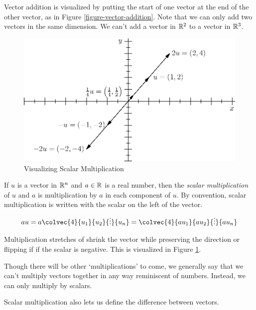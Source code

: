 \documentclass[fleqn,letterpaper]{report}
\begin{document}
Vector addition is visualized by putting the start of one
vector at the end of the other vector, as in Figure
\ref{figure-vector-addition}.  Note that we can only add two vectors
in the same dimension. We can't add a vector in $\mathbb{R}^2$ to a
vector in $\mathbb{R}^3$.

\begin{figure}[t]
\centering
\includegraphics[width=12cm]{figure05.eps}
\caption{Visualizing Scalar Multiplication}
\label{figure-scalar-multiplication}
\end{figure}

\begin{defn}
If $u$ is a vector in $\mathbb{R}^n$ and $a \in
\mathbb{R}$ is a real number, then the \emph{scalar multiplication} of
$u$ and $a$ is multiplication by $a$ in each component of $u$.
By convention, scalar multiplication is written with the
scalar on the left of the vector.
\begin{equation*}
au = a \colvec{4}{u_1}{u_2}{\vdots}{u_n} =
\colvec{4}{au_1}{au_2}{\vdots}{au_n}
\end{equation*}
\end{defn}

Multiplication stretches of shrink the vector while preserving
the direction or flipping if if the scalar is negative. This
is visualized in Figure \ref{figure-scalar-multiplication}. 

Though there will be other `multiplications' to come, we
generally say that we can't multiply vectors together in any way
reminiscent of numbers. Instead, we can only multiply by scalars.

Scalar multiplication also lets us define the difference
between vectors. 
\end{document}
